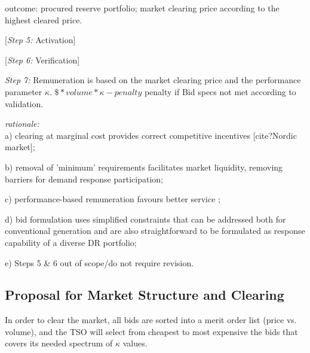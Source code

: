 outcome: procured reserve portfolio; market clearing price according to the highest cleared price.

[\textit{Step 5: }Activation]

[\textit{Step 6:} Verification]

\textit{Step 7:} Remuneration is based on the market clearing price and the performance parameter $\kappa$. 
$\$*volume * \kappa - penalty$
penalty if Bid specs not met according to validation.


\textit{rationale:} \\
a) clearing at marginal cost provides correct competitive incentives [cite?Nordic market]; 

b) removal of 'minimum' requirements facilitates market liquidity, removing barriers for demand response participation;

c) performance-based remuneration favours better service ;

d) bid formulation uses simplified constraints that can be addressed both for conventional generation and are also straightforward to be formulated as response capability of a diverse DR portfolio;

e) Steps 5 \& 6 out of scope/do not require revision.




\subsection{Proposal for Market Structure and Clearing}

In order to clear the market, all bids are sorted into a merit order list (price vs. volume), and the TSO will select from cheapest to most expensive the bids that covers its needed spectrum of $\kappa$ values. 


